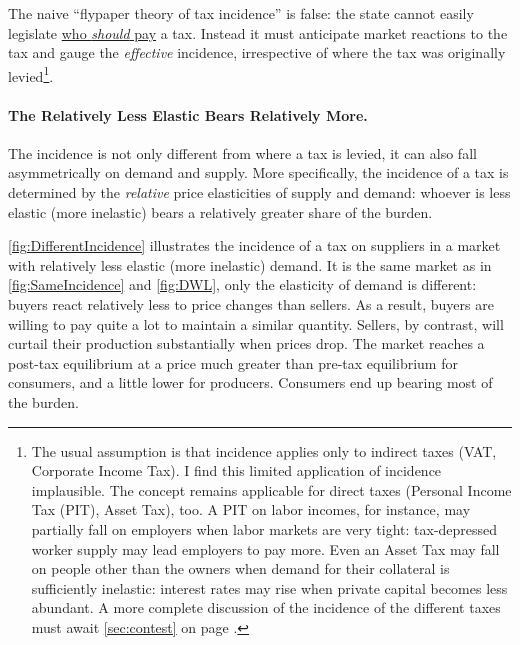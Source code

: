 The naive ``flypaper theory of tax incidence'' is false:
the state cannot easily legislate \href{sec:RedistributionIsPersonal}{who \emph{should} pay} a tax.
Instead it must anticipate market reactions to the tax and gauge the \emph{effective} incidence, irrespective of where the tax was originally levied\footnote{
	The usual assumption is that incidence applies only to indirect taxes (VAT, Corporate Income Tax).
I find this limited application of incidence implausible.
The concept remains applicable for direct taxes (Personal Income Tax (PIT), Asset Tax), too.
A PIT on labor incomes, for instance, may partially fall on employers when labor markets are very tight:
tax-depressed worker supply may lead employers to pay more.
Even an Asset Tax may fall on people other than the owners when demand for their collateral is sufficiently inelastic:
interest rates may rise when private capital becomes less abundant.
A more complete discussion of the incidence of the different taxes must await \autoref{sec:contest} on page \pageref{sec:contest}.}.

\paragraph{The Relatively Less Elastic Bears Relatively More.} The incidence is not only different from where a tax is levied, it can also fall asymmetrically on demand and supply.
More specifically, the incidence of a tax is determined by the \emph{relative} price elasticities of supply and demand:
whoever is less elastic (more inelastic) bears a relatively greater share of the burden.

\autoref{fig:DifferentIncidence} illustrates the incidence of a tax on suppliers in a market with relatively less elastic (more inelastic) demand.
It is the same market as in \autoref{fig:SameIncidence} and \ref{fig:DWL}, only the elasticity of demand is different:
buyers react relatively less to price changes than sellers.
As a result, buyers are willing to pay quite a lot to maintain a similar quantity.
Sellers, by contrast, will curtail their production substantially when prices drop.
The market reaches a post-tax equilibrium at a price much greater than pre-tax equilibrium for consumers, and a little lower for producers.
Consumers end up bearing most of the burden.



